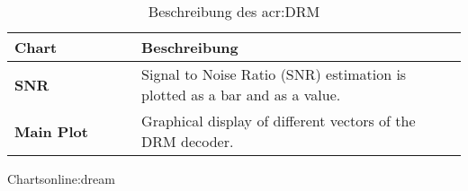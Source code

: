 \begin{table}[ht]
	\begin{center}
		\begin{tabular}{|p{0.28\linewidth} | p{0.72\linewidth}|}
			\toprule
			\textbf{Chart} & \textbf{Beschreibung} \\
			\midrule
			\textbf{SNR} & Signal to Noise Ratio (SNR) estimation is plotted as a bar and as a value.
			\\
			\midrule
			\textbf{Main Plot} & Graphical display of different vectors of the DRM decoder. \\
			\bottomrule
		\end{tabular}
		\caption{Beschreibung des \gls{acr:DRM}}Charts\gls{online:dream}
		\label{tab:drmchart}
	\end{center}
\end{table}


